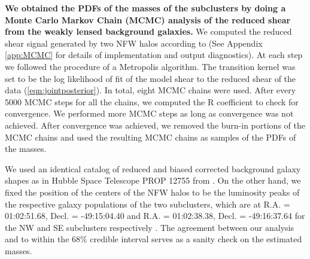 
\textbf{We obtained the PDFs of the masses of the subclusters by doing a Monte
Carlo Markov Chain (MCMC) analysis of the reduced shear from the
weakly lensed background galaxies. } We computed the reduced shear signal
generated by two NFW halos according to \citet{Umetsu2010a} (See Appendix
\ref{app:MCMC} for
details of implementation and output diagnostics).
At each step we followed the procedure of a
Metropolis algorithm.  The transition kernel was set to
be the log likelihood of fit of the model shear to the reduced shear of the
data (\ref{eqn:jointposterior}).
In total, eight MCMC chains were used. After every 5000 MCMC steps for all
the chains, we computed the R coefficient \citep{gr}  to
check for convergence. We performed more MCMC steps as long as convergence
was not achieved. After convergence was achieved, we removed the
burn-in portions of the MCMC chains and used the resulting MCMC chains as
samples of the PDFs of the masses. \par 
We used an identical catalog of reduced and biased corrected background 
galaxy shapes as in Hubble Space Telescope PROP 12755 from . On the other hand, we fixed the
position of the centers of the NFW halos to be  the luminosity peaks of the
respective galaxy populations of  the two subclusters, which are at R.A. = 01:02:51.68, Decl. = -49:15:04.40 and R.A. = 01:02:38.38, Decl. = -49:16:37.64 for the NW and SE subclusters
respectively .  The agreement between our analysis and  to within
the 68\% credible interval serves as a sanity check on the estimated masses. 
